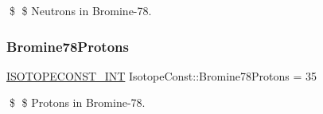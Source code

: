 \$ \$ Neutrons in Bromine-\/78. \mbox{\label{group___isotope_const-_bromine-_br78_ga4a999740b3e5da170592473a805773bc}} 
\subsubsection{\texorpdfstring{Bromine78\+Protons}{Bromine78Protons}}
{\footnotesize\ttfamily \mbox{\hyperlink{group___isotope_const-_macros_ga5f18360b3e99483a35c32d789e62621c}{I\+S\+O\+T\+O\+P\+E\+C\+O\+N\+S\+T\+\_\+\+I\+NT}} Isotope\+Const\+::\+Bromine78\+Protons = 35}

\$ \$ Protons in Bromine-\/78. 
